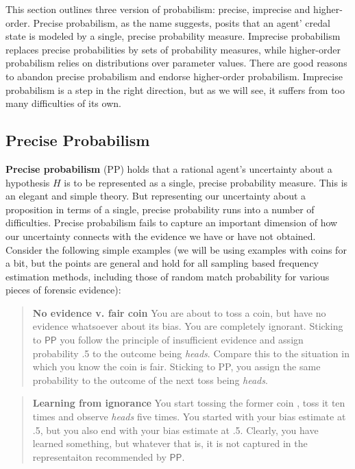 \documentclass[
  10pt,
  dvipsnames,enabledeprecatedfontcommands]{scrartcl}
\newcommand{\s}[1]{\mbox{$\mathsf{#1}$}}
\begin{document}
This section outlines three version of probabilism: precise, imprecise
and higher-order. Precise probabilism, as the name suggests, posits that
an agent' credal state is modeled by a single, precise probability
measure. Imprecise probabilism replaces precise probabilities by sets of
probability measures, while higher-order probabilism relies on
distributions over parameter values. There are good reasons to abandon
precise probabilism and endorse higher-order probabilism. Imprecise
probabilism is a step in the right direction, but as we will see, it
suffers from too many difficulties of its own.

\hypertarget{precise-probabilism}{%
\subsection{Precise Probabilism}\label{precise-probabilism}}

\textbf{Precise probabilism} (\textsf{PP}) holds that a rational agent's
uncertainty about a hypothesis \(H\) is to be represented as a single,
precise probability measure. This is an elegant and simple theory. But
representing our uncertainty about a proposition in terms of a single,
precise probability runs into a number of difficulties. Precise
probabilism fails to capture an important dimension of how our
uncertainty connects with the evidence we have or have not obtained.
Consider the following simple examples (we will be using examples with
coins for a bit, but the points are general and hold for all sampling
based frequency estimation methods, including those of random match
probability for various pieces of forensic evidence):

\begin{quote}
\textbf{No evidence v. fair coin}
You are about to toss a coin, but have no evidence 
whatsoever about its bias. You are completely ignorant. Sticking to \s{PP} you  follow the principle of insufficient evidence and assign probability .5 to the outcome being \emph{heads}.  Compare this to the situation  in which you know the coin is fair. Sticking to PP, you assign the same probability to the outcome of the next toss being \emph{heads}. 
\end{quote}

\begin{quote}
\textbf{Learning from ignorance}
You start  tossing the former coin , toss it ten times and observe \emph{heads} five times. You started with your bias estimate at .5, but you also end with your bias estimate at .5. Clearly, you have learned something, but whatever that is, it is not captured in the representaiton recommended by \s{PP}.
\end{quote}
\end{document}
